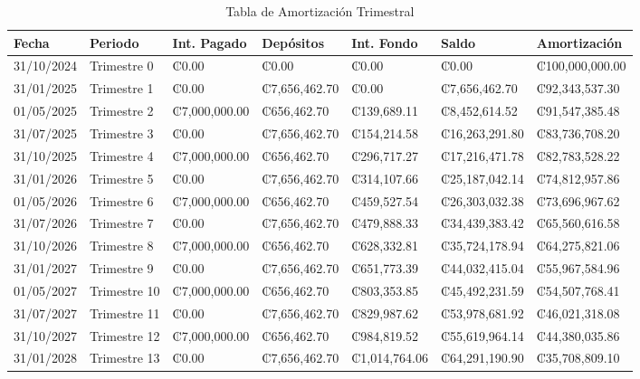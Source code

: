 \documentclass[paper=a4, fontsize=11pt,twoside]{article} %
\begin{document}
    \setlength{\abovecaptionskip}{10pt} %
    \begin{table}[ht]
        \centering
        \caption{Tabla de Amortización Trimestral}
        \begin{tabular}{lllllll}
            \toprule
            \textbf{Fecha} & \textbf{Periodo} & \textbf{Int. Pagado} & \textbf{Depósitos} & \textbf{Int. Fondo} & \textbf{Saldo} & \textbf{Amortización} \\ 
              \midrule
              31/10/2024 & Trimestre 0 & ₡0.00 & ₡0.00 & ₡0.00 & ₡0.00 & ₡100,000,000.00 \\ 
              31/01/2025 & Trimestre 1 & ₡0.00 & ₡7,656,462.70 & ₡0.00 & ₡7,656,462.70 & ₡92,343,537.30 \\ 
              01/05/2025 & Trimestre 2 & ₡7,000,000.00 & ₡656,462.70 & ₡139,689.11 & ₡8,452,614.52 & ₡91,547,385.48 \\ 
              31/07/2025 & Trimestre 3 & ₡0.00 & ₡7,656,462.70 & ₡154,214.58 & ₡16,263,291.80 & ₡83,736,708.20 \\ 
              31/10/2025 & Trimestre 4 & ₡7,000,000.00 & ₡656,462.70 & ₡296,717.27 & ₡17,216,471.78 & ₡82,783,528.22 \\ 
              31/01/2026 & Trimestre 5 & ₡0.00 & ₡7,656,462.70 & ₡314,107.66 & ₡25,187,042.14 & ₡74,812,957.86 \\ 
              01/05/2026 & Trimestre 6 & ₡7,000,000.00 & ₡656,462.70 & ₡459,527.54 & ₡26,303,032.38 & ₡73,696,967.62 \\ 
              31/07/2026 & Trimestre 7 & ₡0.00 & ₡7,656,462.70 & ₡479,888.33 & ₡34,439,383.42 & ₡65,560,616.58 \\ 
              31/10/2026 & Trimestre 8 & ₡7,000,000.00 & ₡656,462.70 & ₡628,332.81 & ₡35,724,178.94 & ₡64,275,821.06 \\ 
              31/01/2027 & Trimestre 9 & ₡0.00 & ₡7,656,462.70 & ₡651,773.39 & ₡44,032,415.04 & ₡55,967,584.96 \\ 
              01/05/2027 & Trimestre 10 & ₡7,000,000.00 & ₡656,462.70 & ₡803,353.85 & ₡45,492,231.59 & ₡54,507,768.41 \\ 
              31/07/2027 & Trimestre 11 & ₡0.00 & ₡7,656,462.70 & ₡829,987.62 & ₡53,978,681.92 & ₡46,021,318.08 \\ 
              31/10/2027 & Trimestre 12 & ₡7,000,000.00 & ₡656,462.70 & ₡984,819.52 & ₡55,619,964.14 & ₡44,380,035.86 \\ 
              31/01/2028 & Trimestre 13 & ₡0.00 & ₡7,656,462.70 & ₡1,014,764.06 & ₡64,291,190.90 & ₡35,708,809.10 \\ 

\end{tabular}
\end{table}
\end{document}
